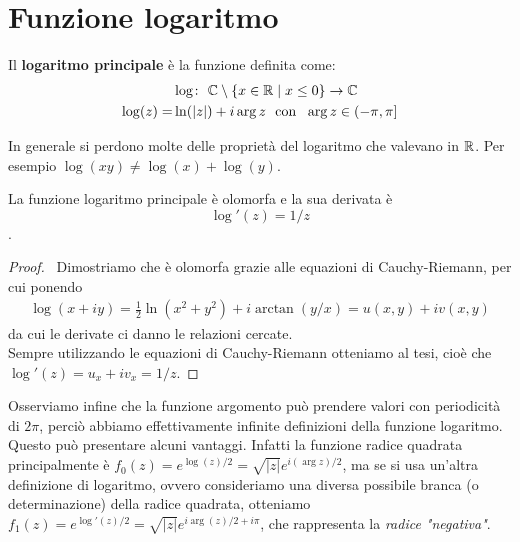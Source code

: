 \section{Funzione logaritmo}
	
	\begin{definition}
		\label{defn:logaritmo-principale}
		Il \textbf{logaritmo principale} è la funzione definita come:
		\begin{equation}
		\begin{aligned}	
			 & \log \colon\ \mathbb{C} \setminus \{x \in \mathbb{R} \mid x \le 0\} \rightarrow \mathbb{C} \\
			 \log(z) = & \ln(|z|) + i\arg z \ \text{  con  } \ \arg z \in (-\pi,\pi]
		\end{aligned}
		\end{equation}
		
	\end{definition}

	\begin{remark}
		In generale si perdono molte delle proprietà del logaritmo che valevano in $\mathbb{R}$. Per esempio $\log(xy) \neq \log(x)+\log(y)$.
	\end{remark}

	\begin{theorem}
		La funzione logaritmo principale è olomorfa e la sua derivata è $$\log'(z) = 1/z$$.
	\end{theorem}
	\begin{proof} \
		Dimostriamo che è olomorfa grazie alle equazioni di Cauchy-Riemann, per cui ponendo
		\begin{equation*}
		\begin{aligned}
			\log(x+iy) = \frac{1}{2}\ln(x^2 + y^2) + i\arctan(y/x) = u(x,y) + iv(x,y)
		\end{aligned}
		\end{equation*}
		da cui le derivate ci danno le relazioni cercate.\\
		
		Sempre utilizzando le equazioni di Cauchy-Riemann otteniamo al tesi, cioè che $\log'(z) = u_x + iv_x = 1/z$.
	\end{proof}
	\begin{remark}
		Osserviamo infine che la funzione argomento può prendere valori con periodicità di $2\pi$, perciò abbiamo effettivamente infinite definizioni della funzione logaritmo. \\ Questo può presentare alcuni vantaggi. Infatti la funzione radice quadrata principalmente è 
		$f_0(z) = e^{\log(z)/2} = \sqrt{|z|}e^{i(\arg z)/2}$, ma se si usa un'altra definizione di logaritmo, ovvero consideriamo una diversa possibile branca (o determinazione) della radice quadrata, otteniamo $f_1(z) = e^{\log'(z)/2} = \sqrt{|z|}e^{i\arg(z)/2 + i\pi}$, che rappresenta la \textit{radice "negativa"}. 
	\end{remark}
